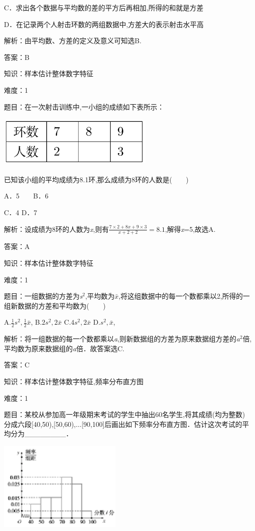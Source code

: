 \documentclass{article} %
\begin{document}
C．求出各个数据与平均数的差的平方后再相加,所得的和就是方差

D．在记录两个人射击环数的两组数据中,方差大的表示射击水平高

解析：由平均数、方差的定义及意义可知选B.

答案：B

知识：样本估计整体数字特征

难度：1

题目：在一次射击训练中,一小组的成绩如下表所示：

\includegraphics*[width=3.00in, height=1in, keepaspectratio=false]{image117}

已知该小组的平均成绩为8.1环,那么成绩为8环的人数是(　　)

A．5　　B．6

C．4    D．7

解析：设成绩为8环的人数为\textit{x},则有$\frac{7\times2+8x+9\times3}{x+2+2}=8.1$,解得\textit{x}=5,故选A.

答案：A


知识：样本估计整体数字特征

难度：1

题目：一组数据的方差为\textit{s}${}^{2}$,平均数为$\bar{x}$,将这组数据中的每一个数都乘以2,所得的一组新数据的方差和平均数为(　　)

A.$\frac{1}{2}s^2,\frac{1}{2}\bar{x}$,  
B.$2s^2,2\bar{x}$
C.$4s^2,2\bar{x}$  
D.$s^2,\bar{x}$,

解析：将一组数据的每一个数都乘以\textit{a},则新数据组的方差为原来数据组方差的\textit{a}${}^{2}$倍,平均数为原来数据组的\textit{a}倍．故答案选C.

答案：C

知识：样本估计整体数字特征,频率分布直方图

难度：1

题目：某校从参加高一年级期末考试的学生中抽出60名学生,将其成绩(均为整数)分成六段[40,50),[50,60),$\dots$[90,100]后画出如下频率分布直方图．估计这次考试的平均分为\_\_\_\_\_\_\_\_．

\includegraphics*[width=2.36in, height=1.74in, keepaspectratio=false]{image93}
\end{document}

